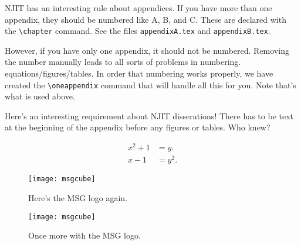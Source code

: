 \label{APP:A}

NJIT has an interesting rule about appendices. If you have more than one appendix, they should be numbered like A, B, and C. These are declared with the \verb#\chapter# command. See the files \texttt{appendixA.tex} and \texttt{appendixB.tex}.

However, if you have only one appendix, it should not be numbered. Removing the number manually leads to all sorts of problems in numbering. equations/figures/tables.  In order that numbering works properly, we have created the \verb#\oneappendix# command that will handle all this for you. Note that's what is used above.

Here's an interesting requirement about NJIT disserations! There has to be text at the beginning of the appendix before any figures or tables. Who knew?

\begin{align}
x^2+1 & = y.\\
x-1 & = y^2.
\end{align}

\begin{figure}[htbp]
\centering
\texttt{[image: msgcube]}
\caption{Here's the MSG logo again.}
\label{fig:2} 
\end{figure}


\begin{figure}[htbp]
\centering
\texttt{[image: msgcube]}
\caption{Once more with the MSG logo.}
\label{fig:3} 
\end{figure}

